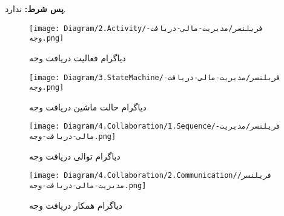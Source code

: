 \noindent
\textbf{پس شرط:}
ندارد.



\begin{figure}[H]
	\texttt{[image: Diagram/2.Activity/فریلنسر/مدیریت-مالی-دریافت-وجه.png]}
	\centering
	\caption{دیاگرام فعالیت دریافت وجه}
	\label{fig:a:دریافت-وجه}
\end{figure}
\begin{figure}[H]
	\texttt{[image: Diagram/3.StateMachine/فریلنسر/مدیریت-مالی-دریافت-وجه.png]}
	\centering
	\caption{دیاگرام حالت ماشین دریافت وجه}
	\label{fig:sm:دریافت-وجه}
\end{figure}
\begin{figure}[H]
	\texttt{[image: Diagram/4.Collaboration/1.Sequence/فریلنسر/مدیریت-مالی-دریافت-وجه.png]}
	\caption{دیاگرام توالی دریافت وجه}
	\centering
	\label{fig:s:دریافت-وجه}
\end{figure}
\begin{figure}[H]
	\texttt{[image: Diagram/4.Collaboration/2.Communication/فریلنسر/مدیریت-مالی-دریافت-وجه.png]}
	\centering
	\caption{دیاگرام همکار دریافت وجه}
	\label{fig:c:دریافت-وجه}
\end{figure}
